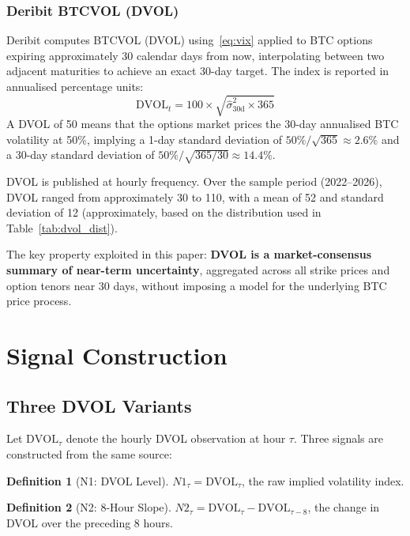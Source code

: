 \documentclass[12pt, a4paper]{article}
\theoremstyle{plain}
\theoremstyle{definition}
\newtheorem{definition}{Definition}[section]
\newcommand{\DVOL}{\mathrm{DVOL}}
\begin{document}
\subsubsection{Deribit BTCVOL (DVOL)}

Deribit computes BTCVOL (DVOL) using~\eqref{eq:vix} applied to BTC
options expiring approximately 30 calendar days from now, interpolating
between two adjacent maturities to achieve an exact 30-day target.
The index is reported in annualised percentage units:
\[
  \DVOL_t = 100 \times \sqrt{\hat{\sigma}^2_{30\text{d}} \times 365}
\]
A DVOL of 50 means that the options market prices the 30-day annualised
BTC volatility at 50\%, implying a 1-day standard deviation of
$50\% / \sqrt{365} \approx 2.6\%$ and a 30-day standard deviation of
$50\%/\sqrt{365/30} \approx 14.4\%$.

DVOL is published at hourly frequency. Over the sample period (2022--2026),
DVOL ranged from approximately 30 to 110, with a mean of 52 and standard
deviation of 12 (approximately, based on the distribution used in
Table~\ref{tab:dvol_dist}).

The key property exploited in this paper: \textbf{DVOL is a
market-consensus summary of near-term uncertainty}, aggregated across all
strike prices and option tenors near 30 days, without imposing a model for
the underlying BTC price process.


\section{Signal Construction}
\label{sec:signal}

\subsection{Three DVOL Variants}

Let $\DVOL_\tau$ denote the hourly DVOL observation at hour $\tau$.
Three signals are constructed from the same source:

\begin{definition}[N1: DVOL Level]
  $N1_\tau = \DVOL_\tau$, the raw implied volatility index.
\end{definition}

\begin{definition}[N2: 8-Hour Slope]
  $N2_\tau = \DVOL_\tau - \DVOL_{\tau - 8}$, the change in DVOL
  over the preceding 8 hours.
\end{definition}
\end{document}
